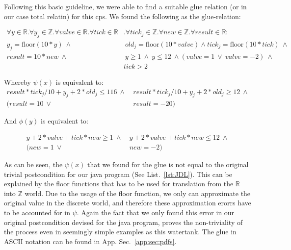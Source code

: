 Following this basic guideline, we were able to find a suitable glue relation (or in our case total relatin) for this cps. We found the following as the glue-relation:

\begin{equation}
	\begin{split}
		\forall y \in \mathbb{R} . \forall y_j \in \mathbb{Z}. \forall valve \in \mathbb{R}. \forall tick \in \mathbb{R}&. \forall tick_j \in \mathbb{Z} . \forall new \in \mathbb{Z}. \forall result \in \mathbb{R} : \\  y_j = \textrm{floor}(10 * y)~\wedge&~ old_j = \textrm{floor}(10*valve) \wedge tick_j = \textrm{floor}(10*tick)~\wedge \\ result = 10 * new~\wedge&~ y \geq 1~\wedge~y \leq 12~\wedge  (valve = 1 ~\vee~valve = -2)~\wedge \\&tick > 2 
	\end{split}
	\label{eq:glueWatertank}
\end{equation}

Whereby \(\psi(x)\) is equivalent to:
\begin{equation}
	\begin{split}
		result * tick_j/10 + y_j + 2 * old_j \leq 116~\wedge&~result * tick_j/10 + y_j + 2 * old_j \geq 12~\wedge \\ (result = 10~\vee&~result = -20)
	\end{split}
	\label{eq:psiWatertank}
\end{equation}

And \(\phi(y)\) is equivalent to:

\begin{equation}
	\begin{split}
		 y + 2 * valve + tick * new \geq 1~\wedge&~y + 2 * valve + tick * new \leq 12~\wedge \\ (new = 1~\vee&~new = -2)
	\end{split}
	\label{eq:phiWatertank}
\end{equation}

As can be seen, the \(\psi(x)\) that we found for the glue is not equal to the original trivial postcondition for our java program (See List.~\ref{lst:JDL}). This can be explained by the floor functions that has to be used for translation from the \(\mathbb{R}\) into \(\mathbb{Z}\) world. Due to the usage of the floor function, we only can approximate the original value in the discrete world, and therefore these approximation erorrs have to be accounted for in \(\psi\). Again the fact that we only found this error in our original postcondition devised for the java program, proves the non-triviality of the process even in seemingly simple examples as this watertank. The glue in ASCII notation can be found in App. Sec.~\ref{app:sec:pdfs}.

